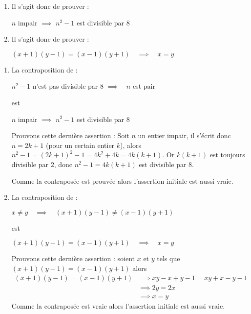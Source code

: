 \documentclass[11pt,class=report,crop=false]{standalone}
\begin{document}
\indication
\sauteligne
\begin{enumerate}
    \item Il s'agit donc de prouver :\\
    \centerline{$n$ impair \quad  $\implies$ \quad  $n^2-1$ est divisible par $8$}
    
    \item  Il s'agit donc de prouver :\\
    \centerline{$ (x+1)(y-1) = (x-1)(y+1) \quad  \implies \quad  x = y$}
\end{enumerate}
\finindication

\correction
\sauteligne
\begin{enumerate}
    \item La contraposition de :\\
    \centerline{$n^2-1$ n'est pas divisible par $8$ \quad $\implies \quad n$ est pair}
    est \\
    \centerline{$n$ impair \quad $\implies$ \quad $n^2-1$ est divisible par $8$}
    
    Prouvons cette dernière assertion :
    Soit $n$ un entier impair, il s'écrit donc $n=2k+1$ (pour un certain entier $k$), alors 
    $n^2-1 = (2k+1)^2-1 = 4k^2+4k = 4k(k+1)$. Or $k(k+1)$ est toujours divisible par $2$, donc $n^2-1 = 4k(k+1)$ est divisible par $8$.
    
    Comme la contraposée est prouvée alors l'assertion initiale est aussi vraie.
    
    
    \item  La contraposition de :\\
    \centerline{$x\neq y \quad \implies \quad (x+1)(y-1)\neq (x-1)(y+1)$}
     est \\
    \centerline{$ (x+1)(y-1) = (x-1)(y+1) \quad \implies \quad x = y$}
    
     Prouvons cette dernière assertion :
     soient $x$ et $y$ tels que  $(x+1)(y-1) = (x-1)(y+1)$ alors 
     \begin{align*}
     (x+1)(y-1) = (x-1)(y+1)
     & \implies  xy -x +y -1 = xy+x-y-1   \\ 
     & \implies 2y = 2x \\
     &\implies x=y
     \end{align*}
   Comme la contraposée est vraie alors l'assertion initiale est aussi vraie.
   
\end{enumerate}
\fincorrection
\finexercice
\end{document}
